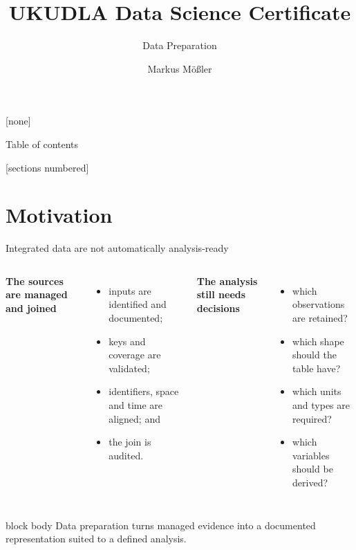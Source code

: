 \documentclass[10pt,aspectratio=169]{beamer}
\title{UKUDLA Data Science Certificate}
\subtitle{Data Preparation}
\author{Markus Mößler}
\institute{University of Hohenheim}
\begin{document}
\maketitle

{
[none]

\begin{frame}[noframenumbering]{Table of contents}

  \small
  [sections numbered]
  \tableofcontents[hideallsubsections]

\end{frame}
}



\section{Motivation}


\begin{frame}{Integrated data are not automatically analysis-ready}

\small

\begin{columns}[T]


\textbf{The sources are managed and joined}

\begin{itemize}
  \item inputs are identified and documented;
  \item keys and coverage are validated;
  \item identifiers, space and time are aligned; and
  \item the join is audited.
\end{itemize}


\textbf{The analysis still needs decisions}

\begin{itemize}
  \item which observations are retained?
  \item which shape should the table have?
  \item which units and types are required?
  \item which variables should be derived?
\end{itemize}

\end{columns}

\vspace{0.35cm}

\begin{beamercolorbox}[rounded=true,sep=8pt]{block body}
Data preparation turns managed evidence into a documented representation suited to a defined analysis.
\end{beamercolorbox}

\end{frame}
\end{document}

